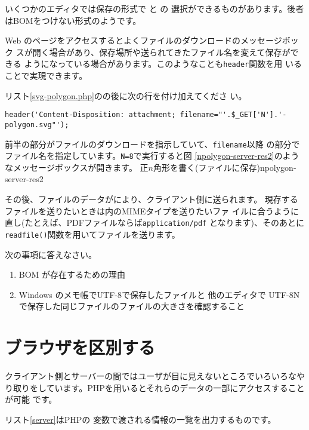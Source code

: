 いくつかのエディタでは保存の形式で  と  の
選択ができるものがあります。後者はBOMをつけない形式のようです。

Web のページをアクセスするとよくファイルのダウンロードのメッセージボック
スが開く場合があり、保存場所や送られてきたファイル名を変えて保存ができる
ようになっている場合があります。このようなことも\texttt{header}関数を用
いることで実現できます。

リスト\ref{svg-polygon.php}のの後に次の行を付け加えてくださ
い。
\begin{verbatim}
header('Content-Disposition: attachment; filename="'.$_GET['N'].'-polygon.svg"');
\end{verbatim}
前半の部分がファイルのダウンロードを指示していて、\texttt{filename}以降
の部分でファイル名を指定しています。\texttt{N=8}で実行すると図
\ref{npolygon-server-res2}のようなメッセージボックスが開きます。
{正$n$角形を書く(ファイルに保存)}{npolygon-server-res2}

その後、ファイルのデータがにより、クライアント側に送られます。
現存するファイルを送りたいときは内のMIMEタイプを送りたいファ
イルに合うように直し(たとえば、PDFファイルならば\texttt{application/pdf}
となります)、そのあとに\texttt{readfile()}関数を用いてファイルを送ります。
\begin{Problem}\upshape
次の事項に答えなさい。
\begin{enumerate}
 \item BOM が存在するための理由
 \item Windows のメモ帳でUTF-8で保存したファイルと 他のエディタで UTF-8N
       で保存した同じファイルのファイルの大きさを確認すること
\end{enumerate}
 
\end{Problem}
\section{ブラウザを区別する}
クライアント側とサーバーの間ではユーザが目に見えないところでいろいろなや
り取りをしています。PHPを用いるとそれらのデータの一部にアクセスすることが可能
です。

リスト\ref{server}はPHPの
変数で渡される情報の一覧を出力するものです。


